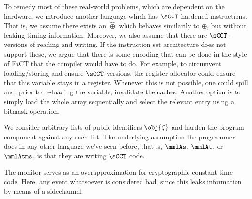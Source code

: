 \documentclass[a4paper,names,dvipsnames]{article}
\begin{document}
To remedy most of these real-world problems, which are dependent on the hardware, we introduce another language which has $\sCCT$-hardened instructions.
That is, we assume there exists an $\hat{\oplus}$ which behaves similarily to $\oplus$, but without leaking timing information.
Moreover, we also assume that there are $\sCCT$-versions of reading and writing.
If the instruction set architecture does not support these, we argue that there is some encoding that can be done in the style of FaCT that the compiler would have to do.
For example, to circumvent loading/storing and ensure $\sCCT$-versions, the register allocator could ensure that this variable stays in a register. Whenever this is not possible, one could spill and, prior to re-loading the variable, invalidate the caches. Another option is to simply load the whole array sequentially and select the relevant entry using a bitmask operation.

We consider arbitrary lists of public identifiers $\obj{\zeta}$ and harden the program component against any such list.
The underlying assumption the programmer does in any other language we've seen before, that is, $\mmlAs$, $\mmlAt$, or $\mmlAtms$, is that they are writing $\sCCT$ code.

The \sCCT monitor serves as an overapproximation for cryptographic constant-time code.
Here, any event whatsoever is considered bad, since this leaks information by means of a sidechannel.
\end{document}

